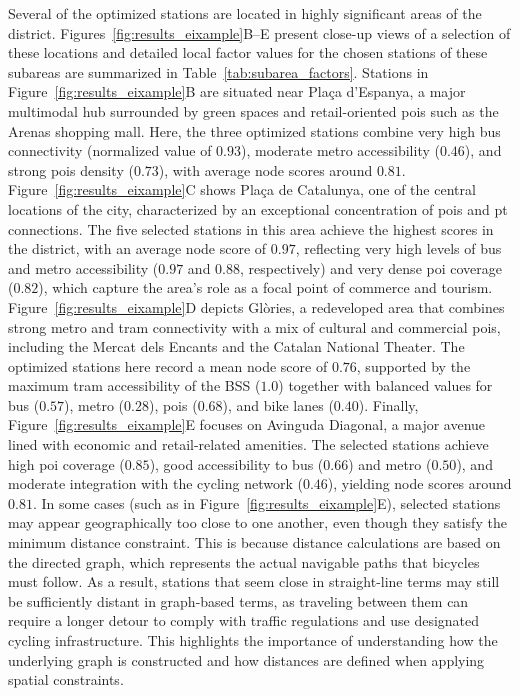     Several of the optimized stations are located in highly significant areas of the district. Figures~\ref{fig:results_eixample}B--E present close-up views of a selection of these locations and detailed local factor values for the chosen stations of these subareas are summarized in Table~\ref{tab:subarea_factors}. Stations in Figure~\ref{fig:results_eixample}B are situated near Plaça d'Espanya, a major multimodal hub surrounded by green spaces and retail-oriented \acp{poi} such as the Arenas shopping mall. Here, the three optimized stations combine very high bus connectivity (normalized value of $0.93$), moderate metro accessibility ($0.46$), and strong \acp{poi} density ($0.73$), with average node scores around $0.81$. Figure~\ref{fig:results_eixample}C shows Plaça de Catalunya, one of the central locations of the city, characterized by an exceptional concentration of \acp{poi} and \ac{pt} connections. The five selected stations in this area achieve the highest scores in the district, with an average node score of $0.97$, reflecting very high levels of bus and metro accessibility ($0.97$ and $0.88$, respectively) and very dense \ac{poi} coverage ($0.82$), which capture the area’s role as a focal point of commerce and tourism. Figure~\ref{fig:results_eixample}D depicts Glòries, a redeveloped area that combines strong metro and tram connectivity with a mix of cultural and commercial \acp{poi}, including the Mercat dels Encants and the Catalan National Theater. The optimized stations here record a mean node score of $0.76$, supported by the maximum tram accessibility of the BSS ($1.0$) together with balanced values for bus ($0.57$), metro ($0.28$), \acp{poi} ($0.68$), and bike lanes ($0.40$). Finally, Figure~\ref{fig:results_eixample}E focuses on Avinguda Diagonal, a major avenue lined with economic and retail-related amenities. The selected stations achieve high \ac{poi} coverage ($0.85$), good accessibility to bus ($0.66$) and metro ($0.50$), and moderate integration with the cycling network ($0.46$), yielding node scores around $0.81$. In some cases (such as in Figure~\ref{fig:results_eixample}E), selected stations may appear geographically too close to one another, even though they satisfy the minimum distance constraint. This is because distance calculations are based on the directed graph, which represents the actual navigable paths that bicycles must follow. As a result, stations that seem close in straight-line terms may still be sufficiently distant in graph-based terms, as traveling between them can require a longer detour to comply with traffic regulations and use designated cycling infrastructure. This highlights the importance of understanding how the underlying graph is constructed and how distances are defined when applying spatial constraints.

